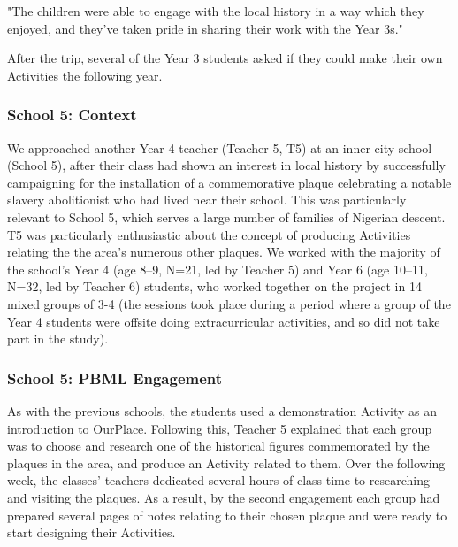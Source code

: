 \begin{displayquote}
"The children were able to engage with the local history in a way which they enjoyed, and they've taken pride in sharing their work with the Year 3s."
\end{displayquote}

After the trip, several of the Year 3 students asked if they could make their own Activities the following year.

\subsubsection{School 5: Context}
We approached another Year 4 teacher (Teacher 5, T5) at an inner-city school (School 5), after their class had shown an interest in local history by successfully campaigning for the installation of a commemorative plaque celebrating a notable slavery abolitionist who had lived near their school. This was particularly relevant to School 5, which serves a large number of families of Nigerian descent. T5 was particularly enthusiastic about the concept of producing Activities relating the the area's numerous other plaques. We worked with the majority of the school's Year 4 (age 8--9, N=21, led by Teacher 5) and Year 6 (age 10--11, N=32, led by Teacher 6) students, who worked together on the project in 14 mixed groups of 3-4 (the sessions took place during a period where a group of the Year 4 students were offsite doing extracurricular activities, and so did not take part in the study). 

\subsubsection{School 5: PBML Engagement}
As with the previous schools, the students used a demonstration Activity as an introduction to OurPlace. Following this, Teacher 5 explained that each group was to choose and research one of the historical figures commemorated by the plaques in the area, and produce an Activity related to them. Over the following week, the classes' teachers dedicated several hours of class time to researching and visiting the plaques. As a result, by the second engagement each group had prepared several pages of notes relating to their chosen plaque and were ready to start designing their Activities.


